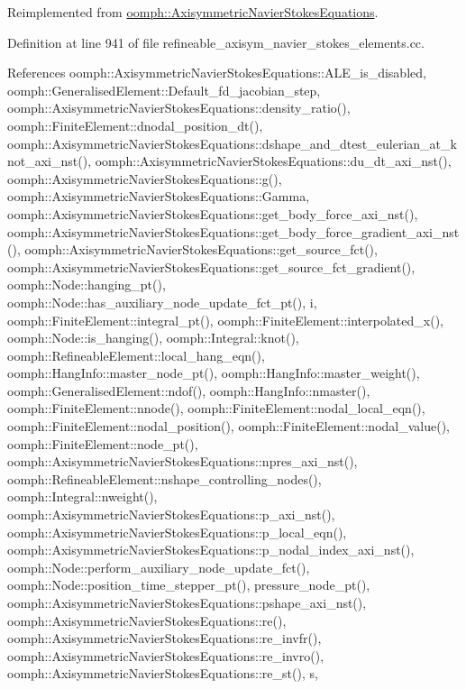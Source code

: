 Reimplemented from \hyperlink{classoomph_1_1AxisymmetricNavierStokesEquations_aea99b11bfac734a5c868aaafffadd820}{oomph\+::\+Axisymmetric\+Navier\+Stokes\+Equations}.



Definition at line 941 of file refineable\+\_\+axisym\+\_\+navier\+\_\+stokes\+\_\+elements.\+cc.



References oomph\+::\+Axisymmetric\+Navier\+Stokes\+Equations\+::\+A\+L\+E\+\_\+is\+\_\+disabled, oomph\+::\+Generalised\+Element\+::\+Default\+\_\+fd\+\_\+jacobian\+\_\+step, oomph\+::\+Axisymmetric\+Navier\+Stokes\+Equations\+::density\+\_\+ratio(), oomph\+::\+Finite\+Element\+::dnodal\+\_\+position\+\_\+dt(), oomph\+::\+Axisymmetric\+Navier\+Stokes\+Equations\+::dshape\+\_\+and\+\_\+dtest\+\_\+eulerian\+\_\+at\+\_\+knot\+\_\+axi\+\_\+nst(), oomph\+::\+Axisymmetric\+Navier\+Stokes\+Equations\+::du\+\_\+dt\+\_\+axi\+\_\+nst(), oomph\+::\+Axisymmetric\+Navier\+Stokes\+Equations\+::g(), oomph\+::\+Axisymmetric\+Navier\+Stokes\+Equations\+::\+Gamma, oomph\+::\+Axisymmetric\+Navier\+Stokes\+Equations\+::get\+\_\+body\+\_\+force\+\_\+axi\+\_\+nst(), oomph\+::\+Axisymmetric\+Navier\+Stokes\+Equations\+::get\+\_\+body\+\_\+force\+\_\+gradient\+\_\+axi\+\_\+nst(), oomph\+::\+Axisymmetric\+Navier\+Stokes\+Equations\+::get\+\_\+source\+\_\+fct(), oomph\+::\+Axisymmetric\+Navier\+Stokes\+Equations\+::get\+\_\+source\+\_\+fct\+\_\+gradient(), oomph\+::\+Node\+::hanging\+\_\+pt(), oomph\+::\+Node\+::has\+\_\+auxiliary\+\_\+node\+\_\+update\+\_\+fct\+\_\+pt(), i, oomph\+::\+Finite\+Element\+::integral\+\_\+pt(), oomph\+::\+Finite\+Element\+::interpolated\+\_\+x(), oomph\+::\+Node\+::is\+\_\+hanging(), oomph\+::\+Integral\+::knot(), oomph\+::\+Refineable\+Element\+::local\+\_\+hang\+\_\+eqn(), oomph\+::\+Hang\+Info\+::master\+\_\+node\+\_\+pt(), oomph\+::\+Hang\+Info\+::master\+\_\+weight(), oomph\+::\+Generalised\+Element\+::ndof(), oomph\+::\+Hang\+Info\+::nmaster(), oomph\+::\+Finite\+Element\+::nnode(), oomph\+::\+Finite\+Element\+::nodal\+\_\+local\+\_\+eqn(), oomph\+::\+Finite\+Element\+::nodal\+\_\+position(), oomph\+::\+Finite\+Element\+::nodal\+\_\+value(), oomph\+::\+Finite\+Element\+::node\+\_\+pt(), oomph\+::\+Axisymmetric\+Navier\+Stokes\+Equations\+::npres\+\_\+axi\+\_\+nst(), oomph\+::\+Refineable\+Element\+::nshape\+\_\+controlling\+\_\+nodes(), oomph\+::\+Integral\+::nweight(), oomph\+::\+Axisymmetric\+Navier\+Stokes\+Equations\+::p\+\_\+axi\+\_\+nst(), oomph\+::\+Axisymmetric\+Navier\+Stokes\+Equations\+::p\+\_\+local\+\_\+eqn(), oomph\+::\+Axisymmetric\+Navier\+Stokes\+Equations\+::p\+\_\+nodal\+\_\+index\+\_\+axi\+\_\+nst(), oomph\+::\+Node\+::perform\+\_\+auxiliary\+\_\+node\+\_\+update\+\_\+fct(), oomph\+::\+Node\+::position\+\_\+time\+\_\+stepper\+\_\+pt(), pressure\+\_\+node\+\_\+pt(), oomph\+::\+Axisymmetric\+Navier\+Stokes\+Equations\+::pshape\+\_\+axi\+\_\+nst(), oomph\+::\+Axisymmetric\+Navier\+Stokes\+Equations\+::re(), oomph\+::\+Axisymmetric\+Navier\+Stokes\+Equations\+::re\+\_\+invfr(), oomph\+::\+Axisymmetric\+Navier\+Stokes\+Equations\+::re\+\_\+invro(), oomph\+::\+Axisymmetric\+Navier\+Stokes\+Equations\+::re\+\_\+st(), s, 